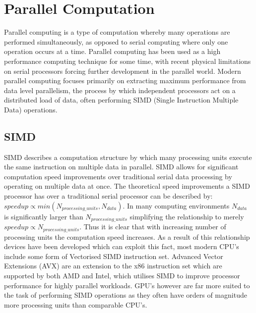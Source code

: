 
\section{Parallel Computation} %
Parallel computing is a type of computation whereby many operations are performed simultaneously, as
opposed to serial computing where only one operation occurs at a time\cite{wikiRef1}. Parallel
computing has been used as a high performance computing technique for some time, with recent
physical limitations on serial processors forcing further development in the parallel world.  Modern
parallel computing focuses primarily on extracting maximum performance from data level parallelism,
the process by which independent processors act on a distributed load of data, often performing SIMD
(Single Instruction Multiple Data) operations. 

\subsection{SIMD}
SIMD describes a computation structure by which many processing units execute the same instruction
on multiple data in parallel. SIMD allows for significant computation speed improvements over
traditional serial data processing by operating on multiple data at once. The theoretical speed
improvements a SIMD processor has over a traditional serial processor can be described by: $ speedup
\propto min\left(N_{processing\_units}, N_{data}\right) $. In many computing environments $N_{data}$
is significantly larger than $N_{processing\_units}$ simplifying the relationship to merely $
speedup \propto N_{processing\_units}$. Thus it is clear that with increasing number of processing
units the computation speed increases. As a result of this relationship devices have been developed
which can exploit this fact, most modern CPU's include some form of Vectorised SIMD instruction set.
Advanced Vector Extensions (AVX) are an extension to the x86 instruction set which are supported by
both AMD and Intel, which utilises SIMD to improve processor performance for highly parallel
workloads. GPU's however are far more suited to the task of performing SIMD operations as they often
have orders of magnitude more processing units than comparable CPU's.

